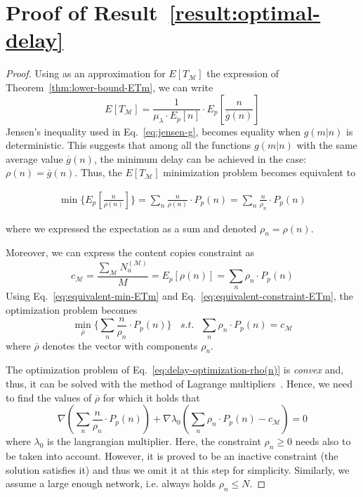 \documentclass[journal]{IEEEtran}
\newcommand{\eq}[1]{Eq.~\eqref{#1}}
\newcommand{\Na}{N_{a}^{(\mathcal{M})}}
\begin{document}
\section{Proof of Result~\ref{result:optimal-delay}}\label{appendix:proof-result:optimal-delay}
\begin{proof}
Using as an approximation for $E[T_{\mathcal{M}}]$ the expression of Theorem~\ref{thm:lower-bound-ETm}, we can write
\begin{equation}
 \textstyle E[T_{\mathcal{M}}]= \frac{1}{\mu_{\lambda}\cdot E_{p}[n]}\cdot E_{p}\left[\frac{n}{\overline{g}(n)}\right]\nonumber
\end{equation}
Jensen's inequality used in \eq{eq:jensen-g}, becomes equality when $g(m|n)$ is deterministic. This suggests that among all the functions $g(m|n)$ with the same average value $\overline{g}(n)$, the minimum delay can be achieved in the case: $\rho(n) = \overline{g}(n)$. Thus, the $E[T_{\mathcal{M}}]$ minimization problem becomes equivalent to 

\begin{footnotesize}
\begin{align}\label{eq:equivalent-min-ETm}
\min\{E_{p}\left[\frac{n}{\rho(n)}\right]\} = \sum_{n} \frac{n}{\rho(n)}\cdot P_{p}(n)=\sum_{n} \frac{n}{\rho_{n}}\cdot P_{p}(n)
\end{align}
\end{footnotesize}
where we expressed the expectation as a sum and denoted $\rho_{n} = \rho(n)$.

Moreover, we can express the content copies constraint as
\begin{equation}\label{eq:equivalent-constraint-ETm}
c_{\mathcal{M}} = \textstyle \frac{\sum_{\mathcal{M}} \Na}{M} = E_{p}[\rho(n)]=\sum_{n} \rho_{n}\cdot P_{p}(n)
\end{equation}
Using \eq{eq:equivalent-min-ETm} and \eq{eq:equivalent-constraint-ETm}, the optimization problem becomes
\begin{equation}\label{eq:delay-optimization-rho(n)}
 \min_{\overline{\rho}}\lbrace \sum_{n} \frac{n}{\rho_{n}}\cdot P_{p}(n)\rbrace~~~~s.t.~~~\sum_{n} \rho_{n}\cdot P_{p}(n)= c_{\mathcal{M}}\end{equation}
where $\overline{\rho}$ denotes the vector with components $\rho_{n}$. 

The optimization problem of \eq{eq:delay-optimization-rho(n)} is \textit{convex} and, thus, it can be solved with the method of Lagrange multipliers~\cite{practical-optimization-book}. Hence, we need to find the values of $\overline{\rho}$ for which it holds that
\begin{equation}
 \nabla \left(\sum_{n} \frac{n}{\rho_{n}}\cdot P_{p}(n)\right) + \nabla \lambda_{0} \left(\sum_{n} \rho_{n}\cdot P_{p}(n)- c_{\mathcal{M}}\right)=0\nonumber
\end{equation}
where $\lambda_{0}$ is the langrangian multiplier. Here, the constraint $\rho_{n}\geq 0$ needs also to be taken into account. However, it is proved to be an inactive constraint (the solution satisfies it) and thus we omit it at this step for simplicity. Similarly, we assume a large enough network, i.e. always holds $\rho_{n}\leq N$.


\end{proof}
\end{document}
